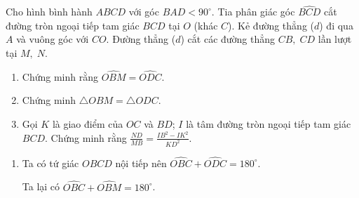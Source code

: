 \begin{bt}%
    Cho hình bình hành $ABCD$ với góc $\widehat{BAD} < 90^{\circ}$. Tia phân giác góc $\widehat{BCD}$ cắt đường tròn ngoại tiếp tam giác $BCD$ tại $O$ (khác $C$). Kẻ đường thẳng ($d$) đi qua $A$ và vuông góc với $CO$. Đường thẳng ($d$) cắt các đường thẳng $CB,\;CD$ lần lượt tại $M,\; N$.
    \begin{enumerate}
        \item Chứng minh rằng $\widehat{OBM}=\widehat{ODC}$.
        \item Chứng minh $\triangle OBM=\triangle ODC$.
        \item Gọi $K$ là giao điểm của $OC$ và $BD$; $I$ là tâm đường tròn ngoại tiếp tam giác $BCD$. Chứng minh rằng $\displaystyle \frac{ND}{MB}= \frac{IB^2-IK^2}{KD^2}$.
    \end{enumerate}
\loigiai
    {
    \begin{center}
    
   
     \end{center}
    \begin{enumerate}
    	
    	\item Ta có tứ giác $OBCD$ nội tiếp nên $\widehat{OBC}+ \widehat{ODC} =180^\circ$.
    	
    	Ta lại có $\widehat{OBC}+ \widehat{OBM}=180^\circ$.
    	

\end{enumerate}}
\end{bt}
